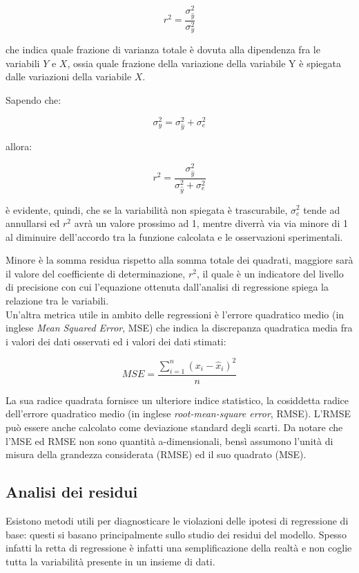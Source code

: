 $$r^{2}=\frac{\sigma_{\hat{y}}^{2}}{\sigma_{y}^{2}}$$\smallskip

che indica quale frazione di varianza totale è dovuta alla dipendenza fra le variabili $Y$ e $X$, ossia quale frazione della variazione della variabile Y è spiegata dalle variazioni della variabile $X$.

Sapendo che:

$$\sigma_{y}^{2}=\sigma_{\hat{y}}^{2}+\sigma_{e}^{2}$$

allora:

$$r^{2}=\frac{\sigma_{\hat{y}}^{2}}{\sigma_{\hat{y}}^{2}+\sigma_{e}^{2}}$$\smallskip

è evidente, quindi, che se la variabilità non spiegata è trascurabile, $\sigma_{e}^{2}$ tende ad annullarsi ed $r^{2}$ avrà un valore prossimo ad 1, mentre diverrà via via minore di 1 al diminuire dell’accordo tra la funzione calcolata e le osservazioni sperimentali.

Minore è la somma residua rispetto alla somma totale dei quadrati, maggiore sarà il valore del coefficiente di determinazione, $r^2$, il quale è un indicatore del livello di precisione con cui l'equazione ottenuta dall'analisi di regressione spiega la relazione tra le variabili. \cite{linear_models}\\

Un'altra metrica utile in ambito delle regressioni è l'errore quadratico medio (in inglese \textit{Mean Squared Error}, MSE) che indica la discrepanza quadratica media fra i valori dei dati osservati ed i valori dei dati stimati:

$$MSE=\frac{\sum_{i=1}^{n}\left(x_{i}-\widehat{x}_{i}\right)^{2}}{n}$$\smallskip

La sua radice quadrata fornisce un ulteriore indice statistico, la cosiddetta radice dell'errore quadratico medio (in inglese \textit{root-mean-square error}, RMSE). L'RMSE può essere anche calcolato come deviazione standard degli scarti. Da notare che l'MSE ed RMSE non sono quantità a-dimensionali, bensì assumono l'unità di misura della grandezza considerata (RMSE) ed il suo quadrato (MSE). 

\subsection{Analisi dei residui}\label{ssec:regressione-residui}
Esistono metodi utili per diagnosticare le violazioni delle ipotesi di regressione di base: questi si basano principalmente sullo studio dei residui del modello. Spesso infatti la retta di regressione è infatti una semplificazione della realtà e non coglie tutta la variabilità presente in un insieme di dati. \cite{residui_pozzolo}

